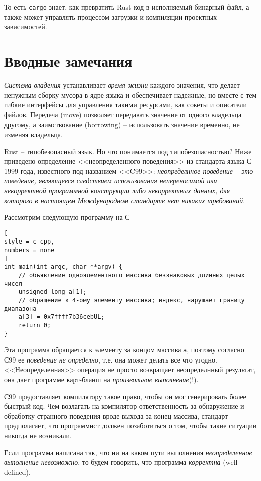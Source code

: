 \documentclass[%
	11pt,
	a4paper,
	utf8,
		]{article}
\begin{document}
То есть \texttt{cargo} знает, как превратить Rust-код в исполняемый бинарный файл, а также может управлять процессом загрузки и компиляции проектных зависимостей.

\section{Вводные замечания}

\emph{Система владения} устанавливает \emph{время жизни} каждого значения, что делает ненужным сборку мусора в ядре языка и обеспечивает надежные, но вместе с тем гибкие интерфейсы для управления такими ресурсами, как сокеты и описатели файлов. Передеча (move) позволяет передавать значение от одного владельца другому, а заимствование (borrowing) -- использовать значение временно, не изменяя владельца.  

Rust -- типобезопасный язык. Но что понимается под типобезопасностью? Ниже приведено определение <<неопределенного поведения>> из стандарта языка С 1999 года, известного под названием <<C99>>: \emph{неопределнное поведение -- это поведение, являющееся следствием использования непереносимой или некорректной программной конструкции либо некорректных данных, для которого в настоящем Международном стандарте нет никаких требований}.

Рассмотрим следующую программу на С
\begin{lstlisting}[
style = c_cpp,
numbers = none
]
int main(int argc, char **argv) {
    // объявление одноэлементного массива беззнаковых длинных целых чисел
    unsigned long a[1];
    // обращение к 4-ому элементу массива; индекс, нарушает границу диапазона
    a[3] = 0x7ffff7b36cebUL; 
    return 0;
}
\end{lstlisting}

Эта программа обращается к элементу за концом массива \texttt{a}, поэтому согласно С99 ее \emph{поведение не определно}, т.е. она может делать все что угодно. {\color{red}<<Неопределенная>> операция не просто возвращает неопределнный результат, она дает программе карт-бланш на \emph{произвольное выполнение}(!).}

С99 предоставляет компилятору такое право, чтобы он мог генерировать более быстрый код. Чем возлагать на компилятор ответственность за обнаружение и обработку странного поведения вроде выхода за конец массива, стандарт предполагает, что программист должен позаботиться о том, чтобы такие ситуации никогда не возникали.

Если программа написана так, что ни на каком пути выполнения \emph{неопределенное выполнение невозможно}, то будем говорить, что программа \emph{корректна} (well defined).
\end{document}
